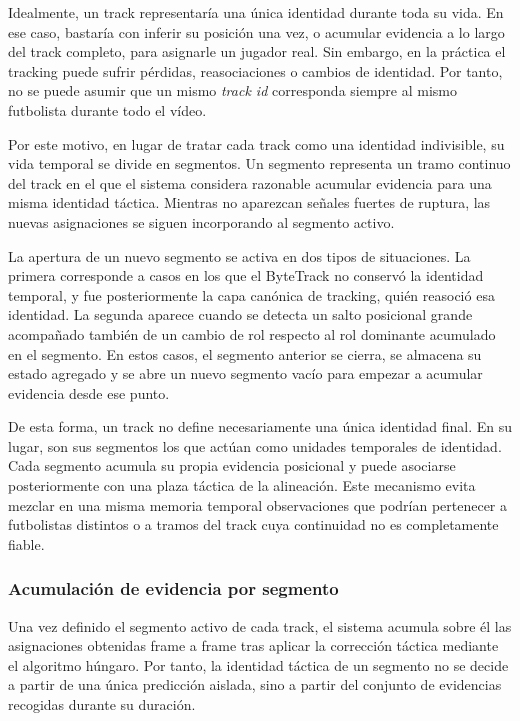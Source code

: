 Idealmente, un track representaría una única identidad durante toda su vida. En ese caso, bastaría con inferir su posición una vez, o acumular evidencia a lo largo del track completo, para asignarle un jugador real. Sin embargo, en la práctica el tracking puede sufrir pérdidas, reasociaciones o cambios de identidad. Por tanto, no se puede asumir que un mismo \textit{track id} corresponda siempre al mismo futbolista durante todo el vídeo.

Por este motivo, en lugar de tratar cada track como una identidad indivisible, su vida temporal se divide en segmentos. Un segmento representa un tramo continuo del track en el que el sistema considera razonable acumular evidencia para una misma identidad táctica. Mientras no aparezcan señales fuertes de ruptura, las nuevas asignaciones se siguen incorporando al segmento activo.

La apertura de un nuevo segmento se activa en dos tipos de situaciones. La primera corresponde a casos en los que el ByteTrack no conservó la identidad temporal, y fue posteriormente la capa canónica de tracking, quién reasoció esa identidad. La segunda aparece cuando se detecta un salto posicional grande acompañado también de un cambio de rol respecto al rol dominante acumulado en el segmento. En estos casos, el segmento anterior se cierra, se almacena su estado agregado y se abre un nuevo segmento vacío para empezar a acumular evidencia desde ese punto.

De esta forma, un track no define necesariamente una única identidad final. En su lugar, son sus segmentos los que actúan como unidades temporales de identidad. Cada segmento acumula su propia evidencia posicional y puede asociarse posteriormente con una plaza táctica de la alineación. Este mecanismo evita mezclar en una misma memoria temporal observaciones que podrían pertenecer a futbolistas distintos o a tramos del track cuya continuidad no es completamente fiable.

\subsubsection{Acumulación de evidencia por segmento}

Una vez definido el segmento activo de cada track, el sistema acumula sobre él las asignaciones obtenidas frame a frame tras aplicar la corrección táctica mediante el algoritmo húngaro. Por tanto, la identidad táctica de un segmento no se decide a partir de una única predicción aislada, sino a partir del conjunto de evidencias recogidas durante su duración.

